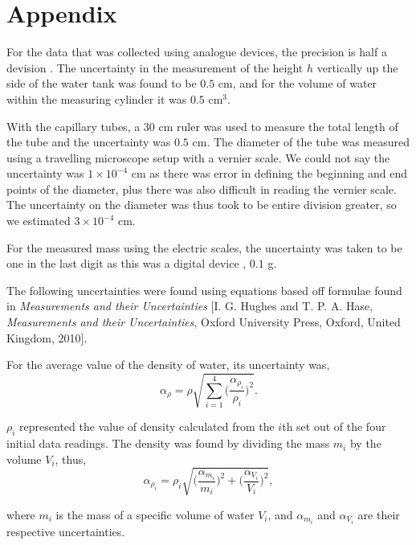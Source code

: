 \documentclass[twocolumn]{revtex4}
\begin{document}
\vfill
\twocolumngrid
\vspace{-3ex}
\section*{Appendix}
\vspace{-2ex}

For the data that was collected using analogue devices, the precision is half a devision \cite{crc}. The uncertainty in the measurement of the height $h$ vertically up the side of the water tank was found to be $0.5$ cm, and for the volume of water within the measuring cylinder it was $0.5$ cm$^{3}$. 

With the capillary tubes, a $30$ cm ruler was used to measure the total length of the tube and the uncertainty was $0.5$ cm. The diameter of the tube was measured using a travelling microscope setup with a vernier scale. We could not say the uncertainty was $1\times10^{-4}$ cm as there was error in defining the beginning and end points of the diameter, plus there was also difficult in reading the vernier scale. The uncertainty on the diameter was thus took to be entire division greater, so we estimated $3\times10^{-4}$ cm. 

For the measured mass using the electric scales, the uncertainty was taken to be one in the last digit as this was a digital device \cite{crc}, $0.1$ g.

The following uncertainties were found using equations based off formulae found in \textit{Measurements and their Uncertainties} [I. G. Hughes and T. P. A. Hase, \textit{Measurements and their Uncertainties}, Oxford University Press, Oxford, United Kingdom, 2010].

For the average value of the density of water, its uncertainty was,
\begin{equation} 
\alpha_{\rho} = \rho \sqrt{ \sum_{i=1}^{4} \Big( \frac{\alpha_{\rho_i}}{\rho_i} \Big)^2 }.
\label{ea-density}
\end{equation}

$\rho_i$ represented the value of density calculated from the $i$th set out of the four initial data readings. The density was found by dividing the mass $m_i$ by the volume $V_{i}$, thus,
\begin{equation} 
\alpha_{\rho_i} = \rho_i \sqrt{ \Bigg( \frac{\alpha_{m_i}}{m_i} \Bigg)^2 + \Bigg( \frac{\alpha_{V_i}}{V_i} \Bigg)^2 },
\label{ea-rho_error}
\end{equation}

where $m_i$ is the mass of a specific volume of water $V_i$, and $\alpha_{m_i}$ and  $\alpha_{V_i}$ are their respective uncertainties.
\end{document}
